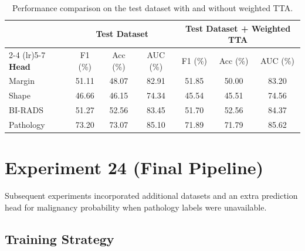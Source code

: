 \documentclass[11pt,a4paper]{article}
\begin{document}
\begin{table}[h]
\centering
\small
\caption{Performance comparison on the test dataset with and without weighted TTA.}
\begin{tabular}{lcccccc}
\toprule
& \multicolumn{3}{c}{\textbf{Test Dataset}} 
& \multicolumn{3}{c}{\textbf{Test Dataset + Weighted TTA}} \\
\cmidrule(lr){2-4} \cmidrule(lr){5-7}
\textbf{Head} 
& F1 (\%) & Acc (\%) & AUC (\%) 
& F1 (\%) & Acc (\%) & AUC (\%) \\
\midrule
Margin    & 51.11 & 48.07 & 82.91 & 51.85 & 50.00 & 83.20 \\
Shape     & 46.66 & 46.15 & 74.34 & 45.54 & 45.51 & 74.56 \\
BI-RADS   & 51.27 & 52.56 & 83.45 & 51.70 & 52.56 & 84.37 \\
Pathology & 73.20 & 73.07 & 85.10 & 71.89 & 71.79 & 85.62 \\
\bottomrule
\end{tabular}
\end{table}

\section{Experiment 24 (Final Pipeline)}
Subsequent experiments incorporated additional datasets and an extra prediction head for malignancy probability when pathology labels were unavailable.

\subsection*{Training Strategy}
\end{document}
